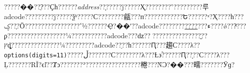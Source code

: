 \documentclass[]{article}
\newenvironment{Shaded}{\begin{snugshade}}{\end{snugshade}}
\newcommand{\CommentTok}[1]{\textcolor[rgb]{0.56,0.35,0.01}{\textit{#1}}}
\newcommand{\ControlFlowTok}[1]{\textcolor[rgb]{0.13,0.29,0.53}{\textbf{#1}}}
\newcommand{\DataTypeTok}[1]{\textcolor[rgb]{0.13,0.29,0.53}{#1}}
\newcommand{\DecValTok}[1]{\textcolor[rgb]{0.00,0.00,0.81}{#1}}
\newcommand{\KeywordTok}[1]{\textcolor[rgb]{0.13,0.29,0.53}{\textbf{#1}}}
\newcommand{\NormalTok}[1]{#1}
\newcommand{\OperatorTok}[1]{\textcolor[rgb]{0.81,0.36,0.00}{\textbf{#1}}}
\newcommand{\OtherTok}[1]{\textcolor[rgb]{0.56,0.35,0.01}{#1}}
\newcommand{\StringTok}[1]{\textcolor[rgb]{0.31,0.60,0.02}{#1}}
\begin{document}
\begin{Shaded}
\end{Shaded}

?????��???ֻ??Ҫһ??????\emph{address}??֧?????ĵ?????Ҳ֧????????ʽ?????????루adcode?????????ĵ?????ѯʱ?????С????????㼶???п????????????Ե??????ˣ?Ҳ????һ???ؼ??ֶ?Ӧ?????????????????ߵ½??????Ҿ?��ʹ??adcode????????\href{http://lbs.amap.com/api/webservice/download}{????}???ء????ǿ???ͨ???ϼ??????????????????¼???????????adcode???ǳ??򵥣???????????????ֱ??ץȡָ???????????????¼?????????adcode??ֵ??һ??????Ԥ???趨С????λ??\texttt{options(digits=11)}?????ڵ???????С????????λ???Ƚ϶࣬??????Ԥ??ָ??С????λ???Ļ???????RĬ?ϵľ??Ⱦͻ???????ʾ?????????????????棬???ǸϽ?��???㽭???????Ӱɡ?

\begin{Shaded}
\begin{Highlighting}[]
\NormalTok{   zj<-}\KeywordTok{get_location}\NormalTok{(}\StringTok{'浙江省'}\NormalTok{) }\OperatorTok{%
\end{Highlighting}
\end{Shaded}
\end{document}

